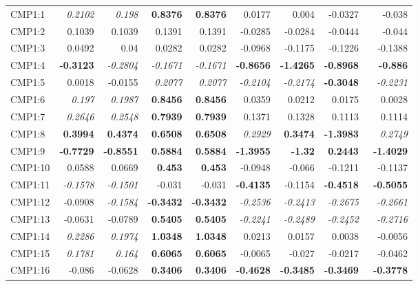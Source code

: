 \documentclass[review]{elsarticle}
\begin{document}
\begin{center}
\begin{longtable}{lrrrrrrrr}
CMP1:1 & \textit{0.2102} &\textit{0.198}& \textbf{0.8376} & \textbf{0.8376} & 0.0177 & 0.004 & -0.0327 & -0.038\\
CMP1:2 & 0.1039 & 0.1039 & 0.1391 & 0.1391 & -0.0285 & -0.0284 & -0.0444 & -0.044 \\
CMP1:3 & 0.0492 & 0.04 & 0.0282 & 0.0282 & -0.0968 & -0.1175 & -0.1226 & -0.1388 \\
CMP1:4 & \textbf{-0.3123} & \textit{-0.2804} & \textit{-0.1671} & \textit{-0.1671} & \textbf{-0.8656} & \textbf{-1.4265} & \textbf{-0.8968} & \textbf{-0.886}\\
CMP1:5 & 0.0018 & -0.0155 & \textit{0.2077} & \textit{0.2077} & \textit{-0.2104} & \textit{-0.2174} & \textbf{-0.3048} & \textit{-0.2231}\\
CMP1:6 & \textit{0.197} & \textit{0.1987} & \textbf{0.8456} & \textbf{0.8456} & 0.0359 & 0.0212 & 0.0175 & 0.0028 \\
CMP1:7 & \textit{0.2646} & \textit{0.2548} & \textbf{0.7939} & \textbf{0.7939} & 0.1371 & 0.1328 & 0.1113 & 0.1114 \\
CMP1:8 & \textbf{0.3994} & \textbf{0.4374} & \textbf{0.6508} & \textbf{0.6508} & \textit{0.2929} & \textbf{0.3474} & \textbf{-1.3983} & \textit{0.2749}\\
CMP1:9 & \textbf{-0.7729} & \textbf{-0.8551} & \textbf{0.5884} & \textbf{0.5884} & \textbf{-1.3955} & \textbf{-1.32} & \textbf{0.2443} & \textbf{-1.4029}\\
CMP1:10 & 0.0588 &  0.0669 & \textbf{0.453} & \textbf{0.453} & -0.0948 & -0.066 & -0.1211 & -0.1137\\
CMP1:11 & \textit{-0.1578} & \textit{-0.1501} & -0.031 & -0.031 & \textbf{-0.4135} & -0.1154 & \textbf{-0.4518} & \textbf{-0.5055}\\
CMP1:12 & -0.0908 & \textit{-0.1584} & \textbf{-0.3432} & \textbf{-0.3432} & \textit{-0.2536} & \textit{-0.2413} & \textit{-0.2675} & \textit{-0.2661}\\
CMP1:13 & -0.0631 & -0.0789 & \textbf{0.5405} & \textbf{0.5405} & \textit{-0.2241} & \textit{-0.2489} & \textit{-0.2452} & \textit{-0.2716}\\
CMP1:14 & \textit{0.2286} & \textit{0.1974} & \textbf{1.0348} & \textbf{1.0348} & 0.0213 & 0.0157 & 0.0038 & -0.0056\\
CMP1:15 & \textit{0.1781} & \textit{0.164} & \textbf{0.6065} & \textbf{0.6065} & -0.0065 & -0.027 & -0.0217 & -0.0462\\
CMP1:16 & -0.086 & -0.0628 & \textbf{0.3406} & \textbf{0.3406} & \textbf{-0.4628} & \textbf{-0.3485} & \textbf{-0.3469} &\ \textbf{-0.3778}\\

\end{longtable}
\end{center}
\end{document}
